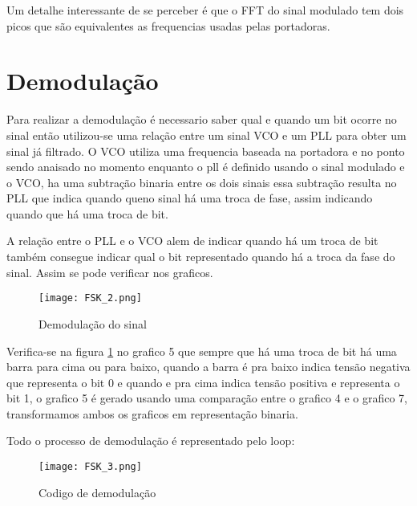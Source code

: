 \documentclass{article}
\begin{document}
        Um detalhe interessante de se perceber é que o FFT do sinal modulado tem dois picos que são equivalentes as frequencias usadas pelas portadoras.
    \section{Demodulação}
        Para realizar a demodulação é necessario saber qual e quando um bit ocorre no sinal então utilizou-se uma relação entre um sinal VCO e um PLL para obter um sinal já filtrado. O VCO utiliza uma frequencia baseada na portadora e no ponto sendo anaisado no momento enquanto o pll é definido usando o sinal modulado e o VCO, ha uma subtração binaria entre os dois sinais essa subtração resulta no PLL que indica quando queno sinal há uma troca de fase, assim indicando quando que há uma troca de bit. 
        
        A relação entre o PLL e o VCO alem de indicar quando há um troca de bit também consegue indicar qual o bit representado quando há a troca da fase do sinal. Assim se pode verificar nos graficos.
        \begin{figure}[H]
            \centering
            \texttt{[image: FSK\_2.png]}
            \caption{Demodulação do sinal}
            \label{fig:demodulacao}
        \end{figure}
        Verifica-se na figura \ref{fig:demodulacao} no grafico 5 que sempre que há uma troca de bit há uma barra para cima ou para baixo, quando a barra é pra baixo indica tensão negativa que representa o bit 0 e quando e pra cima indica tensão positiva e representa o bit 1, o grafico 5 é gerado usando uma comparação entre o grafico 4 e o grafico 7, transformamos ambos os graficos em representação binaria.
        
        Todo o processo de demodulação é representado pelo loop:
        \begin{figure}[H]
            \centering
            \texttt{[image: FSK\_3.png]}
            \caption{Codigo de demodulação}
            \label{fig:codigo}
        \end{figure}
\end{document}

